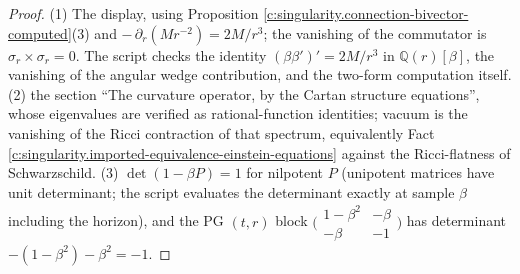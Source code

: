 \documentclass[11pt]{article}
\theoremstyle{definition}
\theoremstyle{plain}
\begin{document}
\begin{proof}
(1) The display, using Proposition \ref{c:singularity.connection-bivector-computed}(3) and $-\,\partial_r(Mr^{-2}) = 2M/r^3$; the vanishing of the commutator is $\sigma_r \times \sigma_r = 0$. The script checks the identity $(\beta\beta')' = 2M/r^3$ in $\mathbb{Q}(r)[\beta]$, the vanishing of the angular wedge contribution, and the two-form computation itself. (2) the section ``The curvature operator, by the Cartan structure equations'', whose eigenvalues are verified as rational-function identities; vacuum is the vanishing of the Ricci contraction of that spectrum, equivalently Fact \ref{c:singularity.imported-equivalence-einstein-equations} against the Ricci-flatness of Schwarzschild. (3) $\det(1 - \beta P) = 1$ for nilpotent $P$ (unipotent matrices have unit determinant; the script evaluates the determinant exactly at sample $\beta$ including the horizon), and the PG $(t,r)$ block $\bigl(\begin{smallmatrix} 1-\beta^2 & -\beta \\ -\beta & -1 \end{smallmatrix}\bigr)$ has determinant $-(1-\beta^2) - \beta^2 = -1$.

\end{proof}
\end{document}
